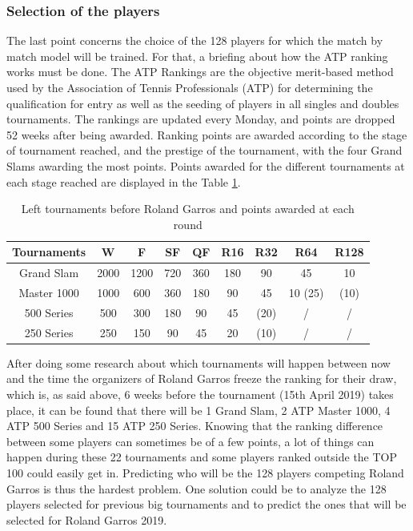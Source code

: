 \documentclass[12pt]{article}
\begin{document}
\subsubsection*{Selection of the players}
The last point concerns the choice of the 128 players for which the match by match model will be trained. For that, a briefing about how the ATP ranking works must be done. The ATP Rankings are the objective merit-based method used by the Association of Tennis Professionals (ATP) for determining the qualification for entry as well as the seeding of players in all singles and doubles tournaments. The rankings are updated every Monday, and points are dropped 52 weeks after being awarded. Ranking points are awarded according to the stage of tournament reached, and the prestige of the tournament, with the four Grand Slams awarding the most points. Points awarded for the different tournaments at each stage reached are displayed in the Table \ref{tournaments}.
\begin{table}[h!]
    \centering
    \begin{tabular}{|c|c|c|c|c|c|c|c|c|}
  \hline
  Tournaments & W & F & SF & QF & R16 & R32 & R64 & R128 \\
  \hline
  Grand Slam & 2000 & 1200 & 720 & 360 & 180 & 90 & 45 & 10\\
  \hline
  Master 1000 & 1000 & 600 & 360 & 180 & 90 & 45 & 10 (25) & (10) \\
  \hline
  500 Series & 500 & 300 & 180 & 90 & 45 & (20) & / & / \\
  \hline
  250 Series & 250 & 150 & 90 & 45 & 20 & (10) & / & /\\
  \hline
\end{tabular}
    \caption{Left tournaments before Roland Garros and points awarded at each round}
    \label{tournaments}
\end{table}

After doing some research about which tournaments will happen between now and the time the organizers of Roland Garros freeze the ranking for their draw, which is, as said above, 6 weeks before the tournament (15th April 2019) takes place, it can be found that there will be 1 Grand Slam, 2 ATP Master 1000, 4 ATP 500 Series and 15 ATP 250 Series. Knowing that the ranking difference between some players can sometimes be of a few points, a lot of things can happen during these 22 tournaments and some players ranked outside the TOP 100 could easily get in. Predicting who will be the 128 players competing Roland Garros is thus the hardest problem. One solution could be to analyze the 128 players selected for previous big tournaments and to predict the ones that will be selected for Roland Garros 2019.
\end{document}
